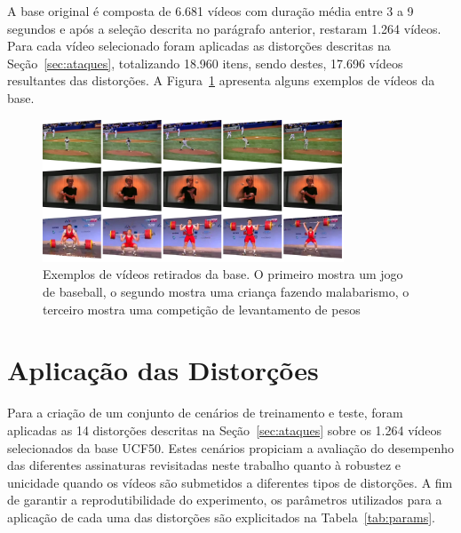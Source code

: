 A base original é composta de 6.681 vídeos com duração média entre 3 a 9 segundos e após a seleção descrita no parágrafo anterior, restaram 1.264 vídeos. Para cada vídeo selecionado foram aplicadas as distorções descritas na Seção~\ref{sec:ataques}, totalizando 18.960 itens, sendo destes, 17.696 vídeos resultantes das distorções. A Figura~\ref{fig:exemplos} apresenta alguns exemplos de vídeos da base.

\begin{figure}
    \centering
    \caption{Exemplos de vídeos retirados da base. O primeiro mostra um jogo de baseball, o segundo mostra uma criança fazendo malabarismo, o terceiro mostra uma competição de levantamento de pesos}
    \label{fig:exemplos}
    \includegraphics[width=0.8\textwidth]{dados/figuras/exemplos.png}
\end{figure}

\section{Aplicação das Distorções}
\label{sec:met-distorcoes}

Para a criação de um conjunto de cenários de treinamento e teste, foram aplicadas as 14 distorções descritas na Seção~\ref{sec:ataques} sobre os 1.264 vídeos selecionados da base UCF50. Estes cenários propiciam a avaliação do desempenho das diferentes assinaturas revisitadas neste trabalho quanto à robustez e unicidade quando os vídeos são submetidos a diferentes tipos de distorções. A fim de garantir a reprodutibilidade do experimento, os parâmetros utilizados para a aplicação de cada uma das distorções são explicitados na Tabela~\ref{tab:params}.

